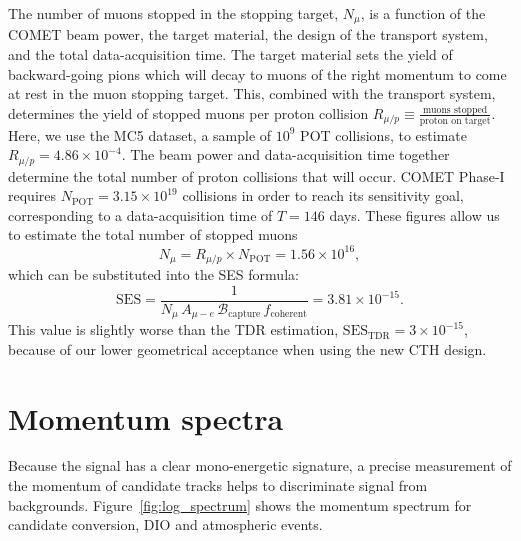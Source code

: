 The number of muons stopped in the stopping target, $N_\mu$, is a function of
the COMET beam power, the target material, the design of the
transport system, and the total data-acquisition time. 
The target material sets the yield of
backward-going pions which will decay to muons of the right momentum to come at
rest in the muon stopping target. This, combined with the transport system,
determines the yield of stopped muons per proton collision $R_{\mu/p} \equiv
\frac{\text{muons stopped}}{\text{proton on target}}$. Here, we use the
MC5 dataset, a sample of $10^9$ POT collisions, to estimate $R_{\mu/p}=4.86
\times 10^{-4}$.
The beam power and data-acquisition time together determine the total number of proton
collisions that will occur. COMET Phase-I requires $N_\mathrm{POT} = 3.15 \times
10^{19}$ collisions in order to reach its sensitivity goal, corresponding to a
data-acquisition time of $T=146$ days.
These figures allow us to estimate the total number of stopped muons
$$N_\mu = R_{\mu/p} \times N_\mathrm{POT} = 1.56\times 10^{16},$$
which can be substituted into the SES formula:
\begin{equation}\label{eq:my_ses}
\mathrm{SES}
=\frac{1}{N_\mu\,A_{\mu-e}\,\mathcal{B}_\mathrm{capture}\,f_\mathrm{coherent}}
= 3.81\times10^{-15}.
\end{equation}
This value is slightly worse than the TDR estimation,
$\mathrm{SES}_\mathrm{TDR}=3\times 10^{-15}$, because of our lower geometrical
acceptance when using the new CTH design.



\section{Momentum spectra}
Because the signal has a clear mono-energetic signature, a precise measurement
of the momentum of candidate tracks helps to discriminate signal from
backgrounds. Figure~\ref{fig:log_spectrum} shows the momentum spectrum
for candidate conversion, DIO and atmospheric events.

